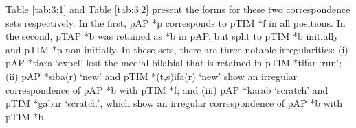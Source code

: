 Table \ref{tab:3:1} and Table \ref{tab:3:2} present the forms for these two correspondence sets respectively. In the first, pAP *p corresponds to pTIM *f in all positions. In the second, pTAP *b was retained as *b in pAP, but split to pTIM *b initially and pTIM *p non-initially. In these sets, there are three notable irregularities: (i) pAP *tiara `expel' lost the medial bilabial that is retained in pTIM *tifar `run'; (ii) pAP *siba(r) `new' and pTIM *(t,s)ifa(r) `new' show an irregular correspondence of pAP *b with pTIM *f; and (iii) pAP *karab `scratch' and pTIM *gabar `scratch', which show an irregular correspondence of pAP *b with pTIM *b. 
 


